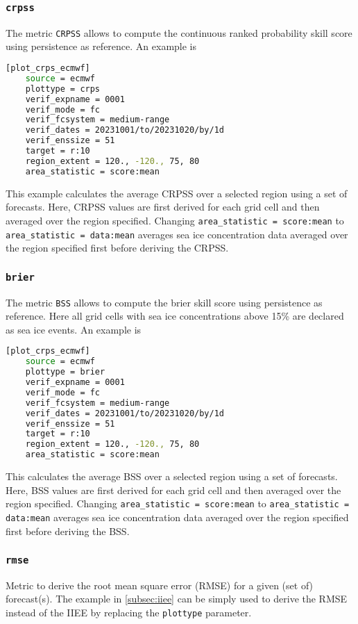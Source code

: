 \documentclass[DIV=10, parskip=full]{scrreprt}
\begin{document}
\subsubsection{\texttt{crpss}}
The metric \texttt{CRPSS} allows to compute the continuous ranked probability skill score using persistence as reference. An example is

\begin{lstlisting}[language=bash]
	[plot_crps_ecmwf]
	source = ecmwf
	plottype = crps
	verif_expname = 0001
	verif_mode = fc
	verif_fcsystem = medium-range
	verif_dates = 20231001/to/20231020/by/1d
	verif_enssize = 51
	target = r:10
	region_extent = 120., -120., 75, 80
	area_statistic = score:mean
\end{lstlisting}
This example calculates the average CRPSS over a selected region using a set of forecasts. Here, CRPSS values are first derived for each grid cell and then averaged over the region specified. Changing \texttt{area\_statistic = score:mean} to \texttt{area\_statistic = data:mean}  averages sea ice concentration data averaged over the region specified first before deriving the CRPSS. 


\subsubsection{\texttt{brier}}
The metric \texttt{BSS} allows to compute the brier skill score using persistence as reference. Here all grid cells with sea ice concentrations above 15\% are declared as sea ice events. An example is

\begin{lstlisting}[language=bash]
	[plot_crps_ecmwf]
	source = ecmwf
	plottype = brier
	verif_expname = 0001
	verif_mode = fc
	verif_fcsystem = medium-range
	verif_dates = 20231001/to/20231020/by/1d
	verif_enssize = 51
	target = r:10
	region_extent = 120., -120., 75, 80
	area_statistic = score:mean
\end{lstlisting}
This calculates the average BSS over a selected region using a set of forecasts. Here, BSS values are first derived for each grid cell and then averaged over the region specified. Changing \texttt{area\_statistic = score:mean} to \texttt{area\_statistic = data:mean}  averages sea ice concentration data averaged over the region specified first before deriving the BSS.  


\subsubsection{\texttt{rmse}}
Metric to derive the root mean square error (RMSE) for a given (set of) forecast(s). The example in \ref{subsec:iiee} can be simply used to derive the RMSE instead of the IIEE by replacing the \texttt{plottype} parameter. 
\end{document}

